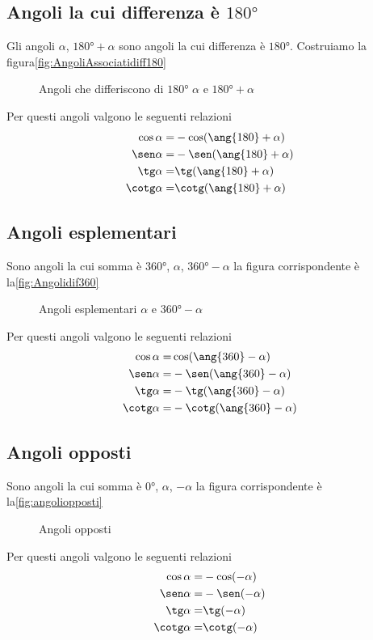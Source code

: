 \subsection{Angoli la cui differenza è $\ang{180}$}
\label{sub:Dif180}
Gli angoli $\alpha$, $\ang{180}+\alpha$ sono angoli la cui differenza è $\ang{180}$.  Costruiamo la figura\nobs\vref{fig:AngoliAssociatidiff180}
\begin{figure}
	\centering
	
	\caption{Angoli che differiscono di $\ang{180}$ $\alpha$ e $\ang{180}+\alpha$}
			\label{fig:AngoliAssociatidiff180}
\end{figure}
Per questi angoli valgono le seguenti relazioni
\begin{align*}
\cos\alpha=&{}-\cos(\ang{180}+\alpha)\\
\sen\alpha=&{}-\sen(\ang{180}+\alpha)\\
\tg\alpha=&{}\tg(\ang{180}+\alpha)\\
\cotg\alpha=&{}\cotg(\ang{180}+\alpha)
\end{align*}
\subsection{Angoli esplementari}
Sono angoli la cui somma è $\ang{360}$, $\alpha$, $\ang{360}-\alpha$ la figura corrispondente è la\nobs\vref{fig:Angolidif360}
\begin{figure} %
		\centering
			
			\caption{Angoli esplementari $\alpha$ e $\ang{360}-\alpha$}
			\label{fig:Angolidif360}
	\end{figure}
Per questi angoli valgono le seguenti relazioni
\begin{align*}
\cos\alpha=&{}\cos(\ang{360}-\alpha)\\
\sen\alpha=&{}-\sen(\ang{360}-\alpha)\\
\tg\alpha=&{}-\tg(\ang{360}-\alpha)\\
\cotg\alpha=&{}-\cotg(\ang{360}-\alpha)
\end{align*}
\subsection{Angoli opposti}
Sono angoli la cui somma è $\ang{0}$, $\alpha$, $-\alpha$ la figura corrispondente è la\nobs\vref{fig:angoliopposti}
\begin{figure} %
	\centering
	
	\caption{Angoli opposti}
	\label{fig:angoliopposti}
\end{figure}
Per questi angoli valgono le seguenti relazioni
\begin{align*}
\cos\alpha=&{}-\cos(-\alpha)\\
\sen\alpha=&{}-\sen(-\alpha)\\
\tg\alpha=&{}\tg(-\alpha)\\
\cotg\alpha=&{}\cotg(-\alpha)
\end{align*}
